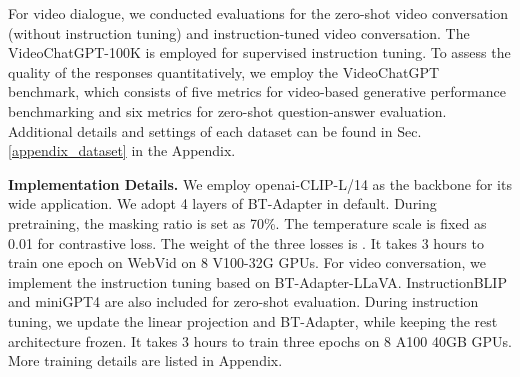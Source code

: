\documentclass{article} \usepackage{iclr2024_conference,times}
\begin{document}
For video dialogue, we conducted evaluations for the zero-shot video conversation (without instruction tuning) and instruction-tuned video conversation. The VideoChatGPT-100K \citep{maaz2023video} is employed for supervised instruction tuning. To assess the quality of the responses quantitatively, we employ the VideoChatGPT benchmark, which consists of five metrics for video-based generative performance benchmarking and six metrics for zero-shot question-answer evaluation. Additional details and settings of each dataset can be found in Sec. \ref{appendix_dataset} in the Appendix.

\noindent \textbf{Implementation Details.}
We employ openai-CLIP-L/14 as the backbone for its wide application. We adopt 4 layers of BT-Adapter in default. During pretraining, the masking ratio  is set as 70\%. The temperature scale  is fixed as 0.01 for contrastive loss. The weight of the three losses is . It takes 3 hours to train one epoch on WebVid on 8 V100-32G GPUs. For video conversation, we implement the instruction tuning based on BT-Adapter-LLaVA. InstructionBLIP and miniGPT4 are also included for zero-shot evaluation. During instruction tuning, we update the linear projection and BT-Adapter, while keeping the rest architecture frozen. It takes 3 hours to train three epochs on 8 A100 40GB GPUs. More training details are listed in Appendix.
\end{document}
